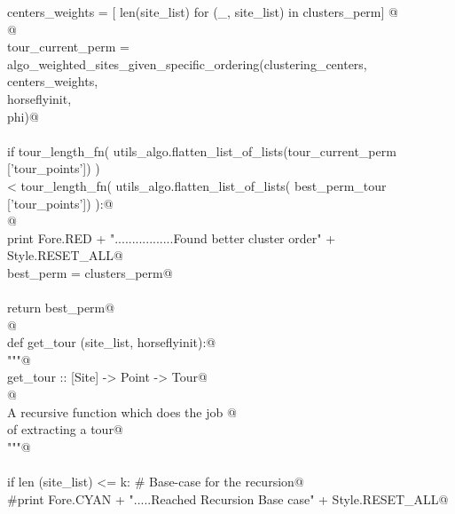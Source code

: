 \documentclass[11.5pt]{report}
\begin{document}
\begin{flushleft}
\begin{list}{}{}
\mbox{}\verb@               centers_weights    = [ len(site_list)  for (_, site_list) in clusters_perm] @\\
\mbox{}\verb@               @\\
\mbox{}\verb@               tour_current_perm = \@\\
\mbox{}\verb@                   algo_weighted_sites_given_specific_ordering(clustering_centers, \@\\
\mbox{}\verb@                                                               centers_weights, \@\\
\mbox{}\verb@                                                               horseflyinit, \@\\
\mbox{}\verb@                                                               phi)@\\
\mbox{}\verb@@\\
\mbox{}\verb@               if tour_length_fn( utils_algo.flatten_list_of_lists(tour_current_perm ['tour_points']) ) \@\\
\mbox{}\verb@                < tour_length_fn( utils_algo.flatten_list_of_lists(   best_perm_tour ['tour_points']) ):@\\
\mbox{}\verb@ @\\
\mbox{}\verb@                   print Fore.RED + ".................Found better cluster order" + Style.RESET_ALL@\\
\mbox{}\verb@                   best_perm = clusters_perm@\\
\mbox{}\verb@@\\
\mbox{}\verb@         return best_perm@\\
\mbox{}\verb@               @\\
\mbox{}\verb@     def get_tour (site_list, horseflyinit):@\\
\mbox{}\verb@        """@\\
\mbox{}\verb@        get_tour :: [Site] -> Point -> Tour@\\
\mbox{}\verb@        @\\
\mbox{}\verb@        A recursive function which does the job @\\
\mbox{}\verb@        of extracting a tour@\\
\mbox{}\verb@        """@\\
\mbox{}\verb@@\\
\mbox{}\verb@        if len (site_list) <= k: # Base-case for the recursion@\\
\mbox{}\verb@              #print Fore.CYAN + ".....Reached Recursion Base case" + Style.RESET_ALL@\\

\end{list}
\end{flushleft}
\end{document}
